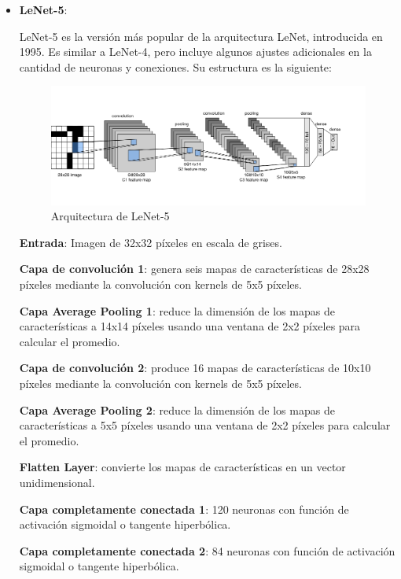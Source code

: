 \begin{itemize}
    \item \textbf{LeNet-5}:

    LeNet-5 es la versión más popular de la arquitectura LeNet, 
    introducida en 1995. Es similar a LeNet-4, pero incluye algunos 
    ajustes adicionales en la cantidad de neuronas y conexiones. 
    Su estructura es la siguiente:

    \begin{figure}[ht!]
        \centering
        \includegraphics[width=\linewidth]{src/figures/lenet_5.png}
        \caption{Arquitectura de LeNet-5 \cite{Lenet_5}}
        \label{fig:lenet-5}
    \end{figure}

    \textbf{Entrada}: Imagen de 32x32 píxeles en escala de grises.

    \textbf{Capa de convolución 1}: genera seis mapas de características
    de 28x28 píxeles mediante la convolución con kernels de 5x5 píxeles.

    \textbf{Capa Average Pooling 1}: reduce la dimensión de los mapas
    de características a 14x14 píxeles usando una ventana de 2x2 píxeles
    para calcular el promedio.

    \textbf{Capa de convolución 2}: produce 16 mapas de características
    de 10x10 píxeles mediante la convolución con kernels de 5x5 píxeles.

    \textbf{Capa Average Pooling 2}: reduce la dimensión de los mapas
    de características a 5x5 píxeles usando una ventana de 2x2 píxeles
    para calcular el promedio.

    \textbf{Flatten Layer}: convierte los mapas de características en
    un vector unidimensional.

    \textbf{Capa completamente conectada 1}: 120 neuronas con función
    de activación sigmoidal o tangente hiperbólica.

    \textbf{Capa completamente conectada 2}: 84 neuronas con función
    de activación sigmoidal o tangente hiperbólica.


\end{itemize}
